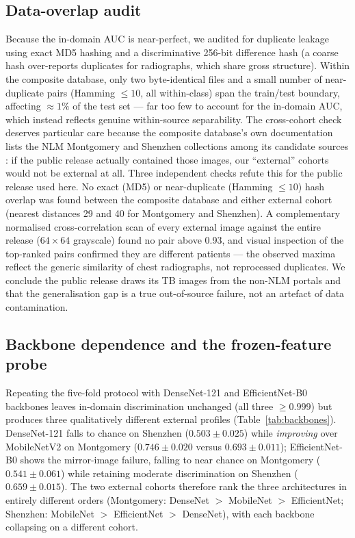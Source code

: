 \documentclass{article}
\begin{document}
\subsection{Data-overlap audit}
Because the in-domain AUC is near-perfect, we audited for duplicate leakage using exact MD5 hashing
and a discriminative 256-bit difference hash (a coarse hash over-reports duplicates for
radiographs, which share gross structure). Within the composite database, only two byte-identical
files and a small number of near-duplicate pairs (Hamming $\leq 10$, all within-class) span the
train/test boundary, affecting ${\approx}1\%$ of the test set --- far too few to account for the
in-domain AUC, which instead reflects genuine within-source separability. The cross-cohort check
deserves particular care because the composite database's own documentation lists the NLM
Montgomery and Shenzhen collections among its candidate sources \citep{rahman2020reliable}: if the
public release actually contained those images, our ``external'' cohorts would not be external at
all. Three independent checks refute this for the public release used here. No exact (MD5) or
near-duplicate (Hamming $\leq 10$) hash overlap was found between the composite database and either
external cohort (nearest distances 29 and 40 for Montgomery and Shenzhen). A complementary
normalised cross-correlation scan of every external image against the entire release
($64 \times 64$ grayscale) found no pair above 0.93, and visual inspection of the top-ranked pairs
confirmed they are different patients --- the observed maxima reflect the generic similarity of
chest radiographs, not reprocessed duplicates. We conclude the public release draws its TB images
from the non-NLM portals and that the generalisation gap is a true out-of-source failure, not an
artefact of data contamination.

\subsection{Backbone dependence and the frozen-feature probe}
\label{sec:backbones}
Repeating the five-fold protocol with DenseNet-121 and EfficientNet-B0 backbones leaves in-domain
discrimination unchanged (all three $\geq 0.999$) but produces three qualitatively different
external profiles (Table~\ref{tab:backbones}). DenseNet-121 falls to chance on Shenzhen
($0.503 \pm 0.025$) while \emph{improving} over MobileNetV2 on Montgomery ($0.746 \pm 0.020$ versus
$0.693 \pm 0.011$); EfficientNet-B0 shows the mirror-image failure, falling to near chance on
Montgomery ($0.541 \pm 0.061$) while retaining moderate discrimination on Shenzhen
($0.659 \pm 0.015$). The two external cohorts therefore rank the three architectures in entirely
different orders (Montgomery: DenseNet $>$ MobileNet $>$ EfficientNet; Shenzhen:
MobileNet $>$ EfficientNet $>$ DenseNet), with each backbone collapsing on a different cohort.
\end{document}
